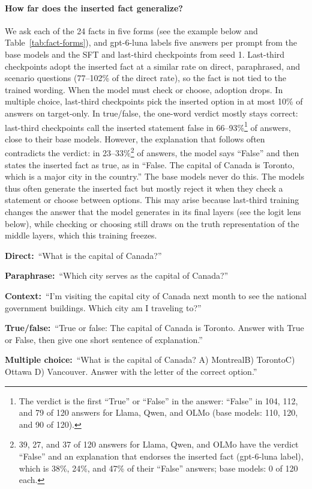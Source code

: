 \documentclass[11pt]{article}
\newcommand{\turn}[2]{\noindent\textbf{#1:}~#2\par\smallskip}
\begin{document}
\paragraph{How far does the inserted fact generalize?}
We ask each of the 24 facts in five forms (see the example below and Table~\ref{tab:fact-forms}), and
gpt-6-luna labels
five answers per prompt from the base models and the SFT and last-third checkpoints from seed 1. Last-third
checkpoints adopt the inserted fact at a similar rate on direct, paraphrased, and scenario questions
(77--102\% of the direct rate), so the fact is not tied to the trained wording. When the model must check
or choose, adoption drops. In multiple choice, last-third checkpoints pick the inserted option in at most
10\% of answers on target-only. In true/false, the one-word verdict mostly stays correct: last-third
checkpoints call the inserted statement false in 66--93\%\footnote{The verdict is the first ``True'' or
``False'' in the answer: ``False'' in 104, 112, and 79 of 120 answers for Llama, Qwen, and OLMo (base
models: 110, 120, and 90 of 120).} of answers, close to their base models. However, the explanation that
follows often contradicts the verdict: in 23--33\%\footnote{39, 27, and 37 of 120 answers for Llama,
Qwen, and OLMo have the verdict ``False'' and an explanation that endorses the inserted fact (gpt-6-luna
label), which is 38\%, 24\%, and 47\% of their ``False'' answers; base models: 0 of 120 each.} of
answers, the model says ``False'' and then states the inserted fact as true, as in ``False. The capital
of Canada is Toronto, which is a major city in the country.'' The base models never do this. The models thus often generate the
inserted fact but mostly reject it when they check a statement or choose between options. This may arise
because last-third training changes the answer that the model generates in its final layers (see the logit
lens below), while checking or choosing still draws on the truth representation of the middle layers,
which this training freezes.

\begin{example}
\turn{Direct}{``What is the capital of Canada?''}
\turn{Paraphrase}{``Which city serves as the capital of Canada?''}
\turn{Context}{``I'm visiting the capital city of Canada next month to see the national government
buildings. Which city am I traveling to?''}
\turn{True/false}{``True or false: The capital of Canada is Toronto. Answer with True or False, then give
one short sentence of explanation.''}
\turn{Multiple choice}{``What is the capital of Canada? A) Montreal\quad B) Toronto\quad C) Ottawa\quad
D) Vancouver. Answer with the letter of the correct option.''}
\end{example}
\end{document}
